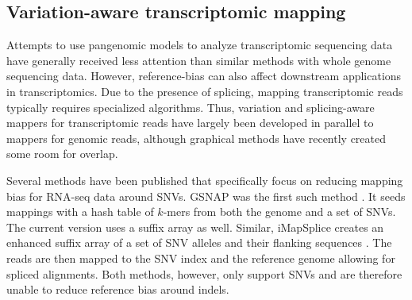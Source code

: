 
    



\subsection{Variation-aware transcriptomic mapping}

Attempts to use pangenomic models to analyze transcriptomic sequencing data have generally received less attention than similar methods with whole genome sequencing data.
However, reference-bias can also affect downstream applications in transcriptomics.
Due to the presence of splicing, mapping transcriptomic reads typically requires specialized algorithms.
Thus, variation and splicing-aware mappers for transcriptomic reads have largely been developed in parallel to mappers for genomic reads, although graphical methods have recently created some room for overlap.

Several methods have been published that specifically focus on reducing mapping bias for RNA-seq data around SNVs. 
GSNAP was the first such method \cite{Wu2010-hv}.
It seeds mappings with a hash table of $k$-mers from both the genome and a set of SNVs.
The current version uses a suffix array as well. 
Similar, iMapSplice creates an enhanced suffix array of a set of SNV alleles and their flanking sequences \cite{Liu_2018}.
The reads are then mapped to the SNV index and the reference genome allowing for spliced alignments.
Both methods, however, only support SNVs and are therefore unable to reduce reference bias around indels.

